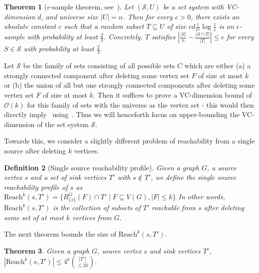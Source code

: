 \documentclass[11pt]{article}
\newtheorem{theorem}{Theorem}[section]
\newtheorem{definition}[theorem]{Definition}
\newcommand{\Reach}{\mathrm{Reach}\xspace}
\renewcommand{\SS}{\mathcal{S}}
\newcommand{\OO}{\mathcal{O}}
\begin{document}
\begin{theorem}[$\epsilon$-sample theorem, see~\cite{fm06}]\label{thm:eps_sample}
Let $(\SS, U)$ be a set system with VC-dimension $d$, and universe size $|U| = n$. Then for every $\epsilon > 0$, there exists an absolute constant $c$ such that a random subset $T \subseteq U$ of size ${cd}\frac{1}{\epsilon^2} \log \frac{1}{\epsilon}$ is an $\epsilon$-sample with probability at least $\frac{2}{3}$. Concretely, $T$ satisfies $\left|\frac{|S|}{n} - \frac{|S \cap T|}{|T|}\right| \leq \epsilon$ for every $S \in \SS$ with probability at least $\frac{2}{3}$.
\end{theorem}










Let $\SS$ be the family of sets consisting of all possible sets $C$ which are either (a) a strongly connected component after deleting some vertex set $F$ of size at most $k$ or (b) the union of all but one strongly connected components after deleting some vertex set $F$ of size at most $k$. Then it suffices to prove a VC-dimension bound of $\OO(k)$ for this family of sets with the universe as the vertex set - this would then directly imply~ using~.
Thus we will henceforth focus on upper-bounding the VC-dimension of the set system $\SS$.


Towards this, we consider a slightly different problem of reachability from a single source after deleting $k$ vertices.

\begin{definition}[Single source reachability profile]
Given a graph $G$, a source vertex $s$ and a set of sink vertices $T'$ with $s \notin T'$, we define the single source reachability profile of $s$ as $\Reach^k(s,T') = \{ R^G_{ \{ s \} } (F) \cap T' \mid F \subseteq V(G), |F| \leq k \}$ 
In other words, $\Reach^k(s,T')$ is the collection of subsets of $T'$ reachable from $s$ after deleting some set of at most $k$ vertices from $G$.

\end{definition}


The next theorem bounds the size of $\Reach^k(s, T')$. 

\begin{theorem}\label{thm:reachability}
Given a graph $G$, source vertex $s$ and sink vertices $T'$, $|\Reach^k(s, T')| \leq 4^k {|T'| \choose \leq 2k}$.
\end{theorem}
\end{document}
